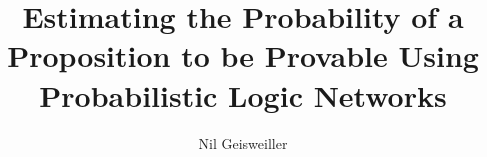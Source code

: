 \documentclass{easychair}
\title{Estimating the Probability of a Proposition to be Provable
  Using Probabilistic Logic Networks}
\author{Nil Geisweiller}
\institute{
  SingularityNET Foundation,\\
  Zug, Switzerland\\
  \email{nil@singularitynet.io}
}
\begin{document}
\maketitle

\begin{abstract}
\end{abstract}

\newpage



\label{sect:bib}
%
%
%


\newpage


\appendix

\end{document}
